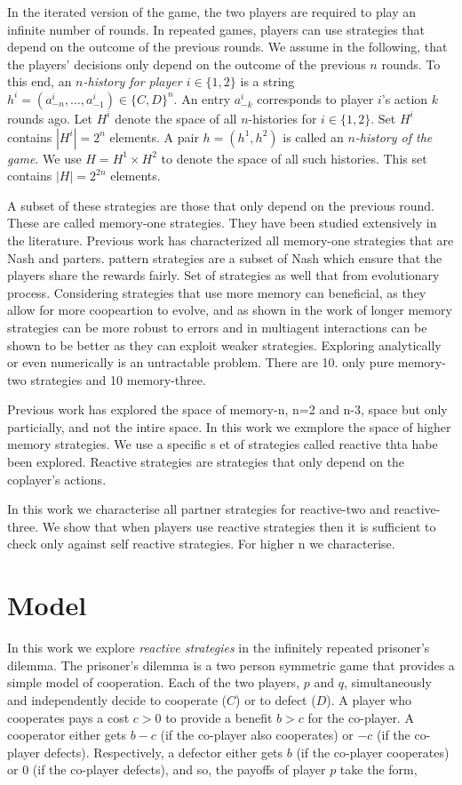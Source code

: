 \documentclass{article}
\theoremstyle{definition}
\begin{document}
In the iterated version of the game, the two players are required to play an
infinite number of rounds. In repeated games, players can use strategies that
depend on the outcome of the previous rounds. We assume in the following, that the players' decisions only depend on the
outcome of the previous $n$ rounds. To this end, an {\it $n$-history for player
$i \in \{1, 2\}$} is a string $h^i=(a^i_{-n},\ldots,a^i_{-1})\!\in\!\{C,D\}^n$. An entry
$a^i_{-k}$ corresponds to player $i$'s action $k$ rounds ago. Let $H^i$ denote
the space of all $n$-histories for $i \in \{1, 2\}$. Set $H^i$
contains $|H^i|=2^{n}$ elements. A pair $h\!=\!(h^1,h^2)$ is called an {\it
$n$-history of the game}. We use $H=H^1\times H^2$ to denote the space of all
such histories. This set contains $|H|=2^{2n}$ elements.

A subset of these strategies are those that only depend on the
previous round. These are called memory-one strategies. They have been studied
extensively in the literature. Previous work has characterized all memory-one
strategies that are Nash and parters. pattern strategies are a subset of Nash
which ensure that the players share the rewards fairly. Set of strategies as
well that from evolutionary process. Considering strategies that use more
memory can beneficial, as they allow for more coopeartion to evolve, and
as shown in the work of longer memory strategies can be more robust to errors
and in multiagent interactions can be shown to be better as they can exploit
weaker strategies. Exploring analytically or even numerically is an untractable
problem. There are 10. only pure memory-two strategies and 10 memory-three.

Previous work has explored the space of memory-n, n=2 and n-3, space but only
particially, and not the intire space. In this work we exmplore the space
of higher memory strategies. We use a specific s  et of strategies called reactive
thta habe been explored. Reactive strategies are strategies that only depend on
the coplayer's actions. 


In this work we characterise all partner strategies
for reactive-two and reactive-three. We show that when players use reactive
strategies then it is sufficient to check only against self reactive strategies.
For higher n we characterise.

\section{Model}

In this work we explore \textit{reactive strategies} in the infinitely repeated
prisoner's dilemma. The prisoner's dilemma is a two person symmetric game that
provides a simple model of cooperation. Each of the two players, \(p\) and
\(q\), simultaneously and independently decide to cooperate (\(C\)) or to defect
(\(D\)). A player who cooperates pays a cost \(c > 0\) to provide a benefit \(b
> c\) for the co-player. A cooperator either gets \(b\!-\!c\) (if the co-player
also cooperates) or \(-c\) (if the co-player defects). Respectively, a defector
either gets \(b\) (if the co-player cooperates) or 0 (if the co-player defects),
and so, the payoffs of player \(p\) take the form,
\end{document}
